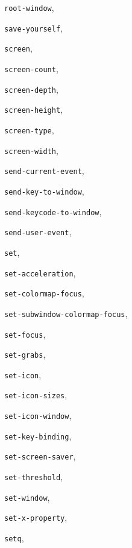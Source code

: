 \begin{theindex}
\item {\tt root-window}, {\bf\pageref{root-window}}
\item {\tt save-yourself}, {\bf\pageref{save-yourself}}
\item {\tt screen}, {\bf\pageref{screen}}
\item {\tt screen-count}, {\bf\pageref{screen-count}}
\item {\tt screen-depth}, {\bf\pageref{screen-depth}}
\item {\tt screen-height}, {\bf\pageref{screen-height}}
\item {\tt screen-type}, {\bf\pageref{screen-type}}
\item {\tt screen-width}, {\bf\pageref{screen-width}}
\item {\tt send-current-event}, {\bf\pageref{send-current-event}}
\item {\tt send-key-to-window}, {\bf\pageref{send-key-to-window}}
\item {\tt send-keycode-to-window}, {\bf\pageref{send-keycode-to-window}}
\item {\tt send-user-event}, {\bf\pageref{send-user-event}}
\item {\tt set}, {\bf\pageref{set}}
\item {\tt set-acceleration}, {\bf\pageref{set-acceleration}}
\item {\tt set-colormap-focus}, {\bf\pageref{set-colormap-focus}}
\item {\tt set-subwindow-colormap-focus}, {\bf\pageref{set-subwindow-colormap-focus}}
\item {\tt set-focus}, {\bf\pageref{set-focus}}
\item {\tt set-grabs}, {\bf\pageref{set-grabs}}
\item {\tt set-icon}, {\bf\pageref{set-icon}}
\item {\tt set-icon-sizes}, {\bf\pageref{set-icon-sizes}}
\item {\tt set-icon-window}, {\bf\pageref{set-icon-window}}
\item {\tt set-key-binding}, {\bf\pageref{set-key-binding}}
\item {\tt set-screen-saver}, {\bf\pageref{set-screen-saver}}
\item {\tt set-threshold}, {\bf\pageref{set-threshold}}
\item {\tt set-window}, {\bf\pageref{set-window}}
\item {\tt set-x-property}, {\bf\pageref{set-x-property}}
\item {\tt setq}, {\bf\pageref{setq}}

\end{theindex}
